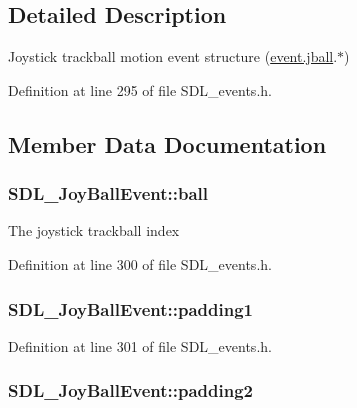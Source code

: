\subsection{Detailed Description}
Joystick trackball motion event structure (\hyperlink{union_s_d_l___event_ae433f511e3383d17f8fe02df745ee8f8}{event.\-jball}.$\ast$) 

Definition at line 295 of file S\-D\-L\-\_\-events.\-h.



\subsection{Member Data Documentation}
\hypertarget{struct_s_d_l___joy_ball_event_add4eb0daeaf95ae56e8c7cfcec560242}{
\subsubsection[{ball}]{ S\-D\-L\-\_\-\-Joy\-Ball\-Event\-::ball}}\label{struct_s_d_l___joy_ball_event_add4eb0daeaf95ae56e8c7cfcec560242}
The joystick trackball index 

Definition at line 300 of file S\-D\-L\-\_\-events.\-h.

\hypertarget{struct_s_d_l___joy_ball_event_aff75a6519ca2a19cffdc14ebf4626613}{
\subsubsection[{padding1}]{ S\-D\-L\-\_\-\-Joy\-Ball\-Event\-::padding1}}\label{struct_s_d_l___joy_ball_event_aff75a6519ca2a19cffdc14ebf4626613}


Definition at line 301 of file S\-D\-L\-\_\-events.\-h.

\hypertarget{struct_s_d_l___joy_ball_event_a0ea3071b99ac096b0157714f01ff04f8}{
\subsubsection[{padding2}]{ S\-D\-L\-\_\-\-Joy\-Ball\-Event\-::padding2}}\label{struct_s_d_l___joy_ball_event_a0ea3071b99ac096b0157714f01ff04f8}


